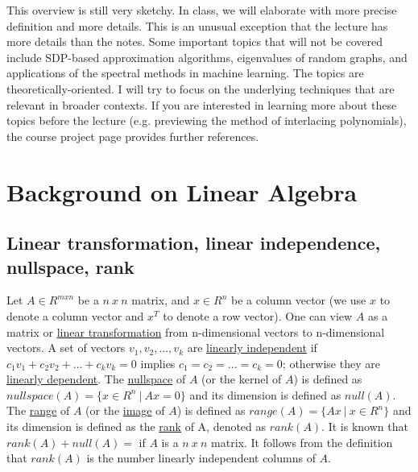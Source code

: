 \documentclass[11pt,a4paper]{report}
\theoremstyle{theoremdd}
\theoremstyle{claims1}
\theoremstyle{proofs1}
\begin{document}
\newline\newline This overview is still very sketchy. In class, we will elaborate with more precise definition and more details. This is an unusual exception that the lecture has more details than the notes.
\newline\newline Some important topics that will not be covered include SDP-based approximation algorithms, eigenvalues of random graphs, and applications of the spectral methods in machine learning.
\newline\newline The topics are theoretically-oriented. I will try to focus on the underlying techniques that are relevant in broader contexts.
\newline\newline If you are interested in learning more about these topics before the lecture (e.g. previewing the method of interlacing polynomials), the course project page provides further references.

\section{Background on Linear Algebra}
\subsection{Linear transformation, linear independence, nullspace, rank}
Let $A\in R^{mxn}$ be a $n\ x \ n$ matrix, and $x\in R^{n}$ be a column vector (we use $x$ to denote a column vector and $x^T$ to denote a row vector).
\newline One can view $A$ as a matrix or \underline{linear transformation} from n-dimensional vectors to n-dimensional vectors.
\newline A set of vectors $v_1,v_2,...,v_k$ are \underline{linearly independent} if $c_1 v_1 + c_2 v_2 + ... + c_k v_k = 0$ implies $c_1=c_2=...=c_k=0$; otherwise they are \underline{linearly dependent}.
\newline The \underline{nullspace} of $A$ (or the kernel of $A$) is defined as $nullspace(A) = \{x\in R^n \ \vert \ Ax=0 \}$
and its dimension is defined as $null(A)$.
\newline The \underline{range} of $A$ (or the \underline{image} of $A$) is defined as $range(A) = \{Ax \ \vert \ x\in R^n\}$ and its dimension is defined as the \underline{rank} of A, denoted as $rank(A)$.
\newline It is known that $rank(A)+null(A)=$ if $A$ is a $n\ x \ n$ matrix.
\newline It follows from the definition that $rank(A)$ is the number linearly independent columns of $A$.
\end{document}
